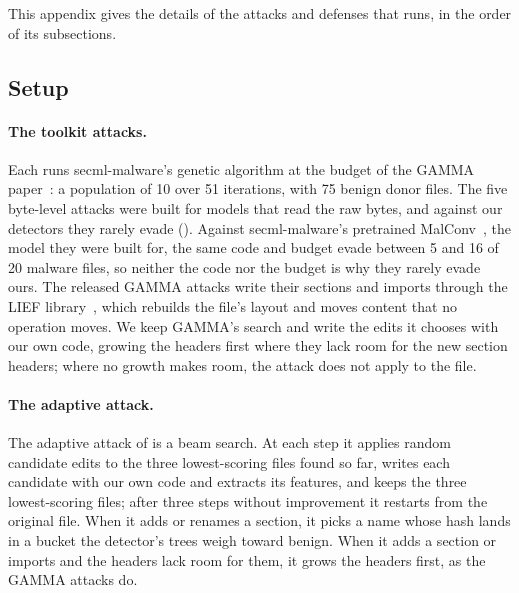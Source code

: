 
This appendix gives the details of the attacks and defenses that  runs, in the order of its
subsections.

\subsection{Setup}
\label{sec:attacks:setup}

\paragraph{The toolkit attacks.} Each runs secml-malware's genetic algorithm at the budget of the GAMMA
paper~\cite{demetrio2021functionality}: a population of 10 over 51 iterations, with 75 benign donor files. The five
byte-level attacks were built for models that read the raw bytes, and against our detectors they rarely evade
(). Against secml-malware's pretrained MalConv~\cite{raff2018malware}, the model they were
built for, the same code and budget evade between 5 and 16 of 20 malware files, so neither the code nor the budget is
why they rarely evade ours. The released GAMMA attacks write their sections and imports through the LIEF library~\cite{lief}, which
rebuilds the file's layout and moves content that no operation moves. We keep GAMMA's search and write the edits it
chooses with our own code, growing the headers first where they lack room for the new section headers; where no growth
makes room, the attack does not apply to the file.

\paragraph{The adaptive attack.} The adaptive attack of  is a beam search. At each step it applies
random candidate edits to the three lowest-scoring files found so far, writes each candidate with our own code and
extracts its features, and keeps the three lowest-scoring files; after three steps without improvement it restarts
from the original file. When it adds or renames a section, it picks a name whose hash lands in a bucket the detector's
trees weigh toward benign. When it adds a section or imports and the headers lack room for them, it grows the headers
first, as the GAMMA attacks do.

